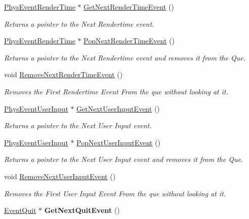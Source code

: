 \begin{DoxyCompactItemize}
\item 
\hyperlink{classPhysEventRenderTime}{PhysEventRenderTime} $\ast$ \hyperlink{classPhysEventManager_a1f2d0506ce816176913e5bdfaa9fd724}{GetNextRenderTimeEvent} ()
\begin{DoxyCompactList}\small\item\em Returns a pointer to the Next Rendertime event. \item\end{DoxyCompactList}\item 
\hyperlink{classPhysEventRenderTime}{PhysEventRenderTime} $\ast$ \hyperlink{classPhysEventManager_ad627925363fdbcff98e0faef204e81e2}{PopNextRenderTimeEvent} ()
\begin{DoxyCompactList}\small\item\em Returns a pointer to the Next Rendertime event and removes it from the Que. \item\end{DoxyCompactList}\item 
void \hyperlink{classPhysEventManager_a56acc075e743921e27284c023b3298ce}{RemoveNextRenderTimeEvent} ()
\begin{DoxyCompactList}\small\item\em Removes the First Rendertime Event From the que without looking at it. \item\end{DoxyCompactList}\item 
\hyperlink{classPhysEventUserInput}{PhysEventUserInput} $\ast$ \hyperlink{classPhysEventManager_a4874a9b1138d2351bf28e527a66c02b8}{GetNextUserInputEvent} ()
\begin{DoxyCompactList}\small\item\em Returns a pointer to the Next User Input event. \item\end{DoxyCompactList}\item 
\hyperlink{classPhysEventUserInput}{PhysEventUserInput} $\ast$ \hyperlink{classPhysEventManager_ad6612a6e1c728941e2c467e7f136ca51}{PopNextUserInputEvent} ()
\begin{DoxyCompactList}\small\item\em Returns a pointer to the Next User Input event and removes it from the Que. \item\end{DoxyCompactList}\item 
void \hyperlink{classPhysEventManager_a9c6f5296c9961fa469ebe06d7599283a}{RemoveNextUserInputEvent} ()
\begin{DoxyCompactList}\small\item\em Removes the First User Input Event From the que without looking at it. \item\end{DoxyCompactList}\item 
\hypertarget{classPhysEventManager_a61aa2ee266536d45fec2be0487f77940}{
\hyperlink{classEventQuit}{EventQuit} $\ast$ {\bfseries GetNextQuitEvent} ()}
\label{d5/dd7/classPhysEventManager_a61aa2ee266536d45fec2be0487f77940}


\end{DoxyCompactItemize}
